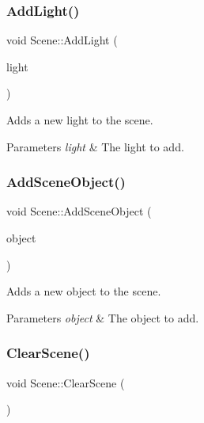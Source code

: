 \subsubsection{\texorpdfstring{Add\+Light()}{AddLight()}}
{\footnotesize\ttfamily void Scene\+::\+Add\+Light (\begin{DoxyParamCaption}\item[{std\+::shared\+\_\+ptr$<$ \hyperlink{class_light}{Light} $>$}]{light }\end{DoxyParamCaption})}



Adds a new light to the scene. 


\begin{DoxyParams}{Parameters}
{\em light} & The light to add. \\
\hline
\end{DoxyParams}
\hypertarget{class_scene_a6e51f14c74c252d231b73d7109b8117e}{}\label{class_scene_a6e51f14c74c252d231b73d7109b8117e} 
\subsubsection{\texorpdfstring{Add\+Scene\+Object()}{AddSceneObject()}}
{\footnotesize\ttfamily void Scene\+::\+Add\+Scene\+Object (\begin{DoxyParamCaption}\item[{std\+::shared\+\_\+ptr$<$ \hyperlink{class_scene_object}{Scene\+Object} $>$}]{object }\end{DoxyParamCaption})}



Adds a new object to the scene. 


\begin{DoxyParams}{Parameters}
{\em object} & The object to add. \\
\hline
\end{DoxyParams}
\hypertarget{class_scene_ac3b0f6126be07f78a61abfac3487e4df}{}\label{class_scene_ac3b0f6126be07f78a61abfac3487e4df} 
\subsubsection{\texorpdfstring{Clear\+Scene()}{ClearScene()}}
{\footnotesize\ttfamily void Scene\+::\+Clear\+Scene (\begin{DoxyParamCaption}{ }\end{DoxyParamCaption})}



